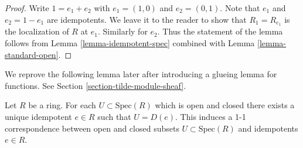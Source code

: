 \begin{proof}
Write $1 = e_1 + e_2$ with $e_1 = (1,0)$ and $e_2 = (0,1)$.
Note that $e_1$ and $e_2 = 1 - e_1$ are idempotents.
We leave it to the reader to show that
$R_1 = R_{e_1}$ is the localization of $R$ at $e_1$.
Similarly for $e_2$.
Thus the statement of the lemma follows from Lemma
\ref{lemma-idempotent-spec} combined with Lemma
\ref{lemma-standard-open}.
\end{proof}

\noindent
We reprove the following lemma later after introducing
a glueing lemma for functions. See Section
\ref{section-tilde-module-sheaf}.

\begin{lemma}
\label{lemma-disjoint-decomposition}
Let $R$ be a ring. For each $U \subset \text{Spec}(R)$
which is open and closed
there exists a unique idempotent $e \in R$ such that
$U = D(e)$. This induces a 1-1 correspondence between
open and closed subsets $U \subset \text{Spec}(R)$ and
idempotents $e \in R$.
\end{lemma}

